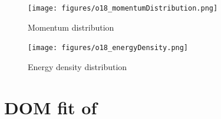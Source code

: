 \begin{figure}[H]
    \centering
    \texttt{[image: figures/o18\_momentumDistribution.png]}
    \caption{Momentum distribution}
    \label{DOMFitData_o18_momentumDistribution}
\end{figure}

\begin{figure}[H]
    \centering
    \texttt{[image: figures/o18\_energyDensity.png]}
    \caption{Energy density distribution}
    \label{DOMFitData_o18_energyDensity}
\end{figure}

\section{DOM fit of \caForty}

\label{ca40DOMOutput}
